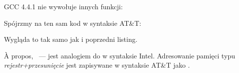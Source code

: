
GCC 4.4.1 nie wywołuje innych funkcji:




Spójrzmy na ten sam kod w syntaksie AT\&T:



\myindex{\ATTSyntax}
Wygląda to tak samo jak i poprzedni listing.

À propos, ~--- jest analogiem do  w syntaksie Intel.
Adresowanie pamięci typu \emph{rejestr+przesunięcie} jest zapisywane w syntaksie AT\&T jako .


